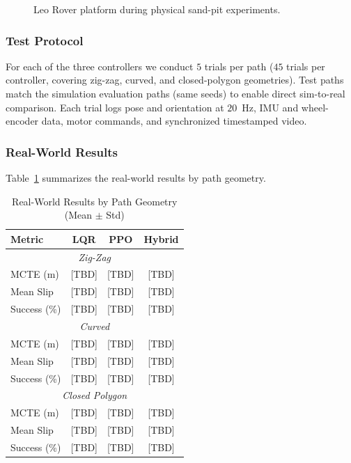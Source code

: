 \documentclass[conference]{IEEEtran}
\begin{document}
\begin{figure}[t]
\centering
{}
\caption{Leo Rover platform during physical sand-pit experiments.}
\label{fig:rover}
\end{figure}

\subsubsection{Test Protocol}
For each of the three controllers we conduct $5$ trials per path ($45$ trials per controller, covering zig-zag, curved, and closed-polygon geometries). Test paths match the simulation evaluation paths (same seeds) to enable direct sim-to-real comparison. Each trial logs pose and orientation at $20$~Hz, IMU and wheel-encoder data, motor commands, and synchronized timestamped video.

\subsubsection{Real-World Results}
Table~\ref{tab:real_results} summarizes the real-world results by path geometry.
\begin{table}[t]
\centering
\caption{Real-World Results by Path Geometry (Mean $\pm$ Std)}
\label{tab:real_results}
\begin{tabular}{@{}lccc@{}}
\toprule
\textbf{Metric} & \textbf{LQR} & \textbf{PPO} & \textbf{Hybrid} \\
\midrule
\multicolumn{4}{c}{\textit{Zig-Zag}} \\
MCTE (m) & [TBD] & [TBD] & [TBD] \\
Mean Slip & [TBD] & [TBD] & [TBD] \\
Success (\%) & [TBD] & [TBD] & [TBD] \\
\midrule
\multicolumn{4}{c}{\textit{Curved}} \\
MCTE (m) & [TBD] & [TBD] & [TBD] \\
Mean Slip & [TBD] & [TBD] & [TBD] \\
Success (\%) & [TBD] & [TBD] & [TBD] \\
\midrule
\multicolumn{4}{c}{\textit{Closed Polygon}} \\
MCTE (m) & [TBD] & [TBD] & [TBD] \\
Mean Slip & [TBD] & [TBD] & [TBD] \\
Success (\%) & [TBD] & [TBD] & [TBD] \\
\bottomrule
\end{tabular}
\end{table}
\end{document}
